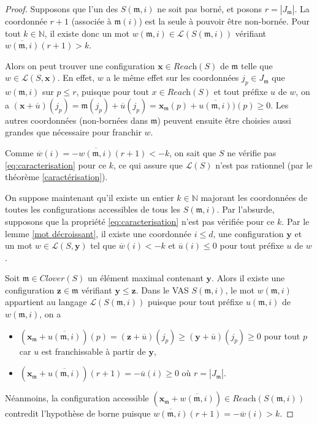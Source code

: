 \documentclass[a4paper,final]{article}
\theoremstyle{definition}
\let\leq\leqslant
\let\geq\geqslant
\newcommand{\N}{\ensuremath{\mathbb{N}}}
\newcommand{\card}[1]{|#1|}
\newcommand{\lang}{\ensuremath{\mathcal{L}}}
\newcommand{\reach}{\ensuremath{\textit{Reach}}}
\newcommand{\clover}{\textit{Clover}}
\newcommand{\vect}[1]{\ensuremath{\mathbf{#1}}}
\newcommand{\valeur}[1]{\ensuremath{\overline{#1}}}
\begin{document}
\begin{proof}
Supposons que l'un des $S(\mathfrak{m},i)$ ne soit pas borné, et posons $r = \card{J_\mathfrak{m}}$.
La coordonnée $r+1$ (associée à $\mathfrak{m}(i)$) est la seule à pouvoir être non-bornée.
Pour tout $k\in\N$, il existe donc un mot $w(\mathfrak{m},i) \in \lang(S(\mathfrak{m},i))$ vérifiant $\valeur{w(\mathfrak{m},i)}(r+1) >k$.

Alors on peut trouver une configuration $\vect{x}\in\reach(S)$ de $\mathfrak{m}$ telle que $w\in\lang(S,\vect{x})$.
En effet, $w$ a le même effet sur les coordonnées $j_p \in J_\mathfrak{m}$ que $w(\mathfrak{m},i)$ sur $p\leq r$,
puisque pour tout $x\in\reach(S)$ et tout préfixe $u$ de $w$, on a
$(\vect{x} +\valeur{u})(j_p) = 
\mathfrak{m}(j_p) +\valeur{u}(j_p) = 
\vect{x}_\mathfrak{m}(p) +\valeur{u(\mathfrak{m},i)})(p) \geq 0$.
Les autres coordonnées (non-bornées dans $\mathfrak{m}$) peuvent ensuite être choisies aussi grandes que nécessaire pour franchir $w$.

Comme $\valeur{w}(i) = -\valeur{w(\mathfrak{m},i)}(r+1) < -k$, on sait que $S$ ne vérifie pas \eqref{eq:caracterisation} pour ce $k$, 
ce qui assure que $\lang(S)$ n'est pas rationnel (par le théorème \ref{caractérisation}).

\vspace{3mm}
On suppose maintenant qu'il existe un entier $k\in\N$ majorant les coordonnées de toutes les configurations accessibles de tous les $S(\mathfrak{m},i)$.
Par l'absurde, supposons que la propriété \eqref{eq:caracterisation} n'est pas vérifiée pour ce $k$.
Par le lemme \ref{mot décroissant}, il existe une coordonnée $i\leq d$, une configuration $\vect{y}$ et un mot $w\in \lang(S,\vect{y})$ tel que  $\valeur{w}(i) < -k$ et $\valeur{u}(i) \leq 0$ pour tout préfixe $u$ de $w$.

Soit $\mathfrak{m} \in\clover(S)$ un élément maximal contenant $\vect{y}$.
Alors il existe une configuration $\vect{z}\in\mathfrak{m}$ vérifiant $\vect{y} \leq \vect{z}$.
Dans le VAS $S(\mathfrak{m},i)$, le mot $w(\mathfrak{m},i)$ appartient au langage $\lang(S(\mathfrak{m},i))$ 
puisque pour tout préfixe $u(\mathfrak{m},i)$ de $w(\mathfrak{m},i)$, on a 
\begin{itemize}
    \item $(\vect{x}_\mathfrak{m} +\valeur{u (\mathfrak{m},i)} )(p) = (\vect{z} +\valeur{u})(j_p) \geq (\vect{y} +\valeur{u})(j_p) \geq 0$ pour tout $p$ car $u$ est franchissable à partir de $\vect{y}$,
    \item $(\vect{x}_\mathfrak{m} +\valeur{u (\mathfrak{m},i)} )(r+1) = -\valeur{u}(i) \geq 0$ où $r = \card{J_\mathfrak{m}}$.
\end{itemize}
Néanmoins, la configuration accessible $(\vect{x}_\mathfrak{m} + \valeur{w(\mathfrak{m},i)}) \in \reach(S(\mathfrak{m},i))$ contredit l'hypothèse de borne puisque $\valeur{w(\mathfrak{m},i)}(r+1) = -\valeur{w}(i) > k$.

\end{proof}
\end{document}
